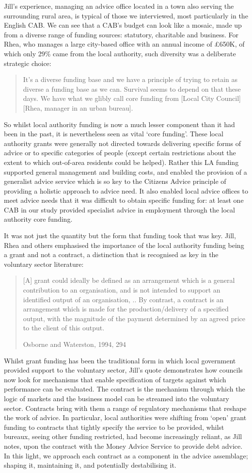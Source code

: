 Jill’s experience, managing an advice office located in a town also serving the surrounding rural area, is typical of those we interviewed, most particularly in the English CAB. We can see that a CAB’s budget can look like a mosaic, made up from a diverse range of funding sources: statutory, charitable and business. For Rhea, who manages a large city-based office with an annual income of £650K, of which only 29\% came from the local authority, such diversity was a deliberate strategic choice:
    \blockquote{It’s a diverse funding base and we have a principle of trying to retain as diverse a funding base as we can. Survival seems to depend on that these days. We have what we glibly call core funding from [Local City Council] [Rhea, manager in an urban bureau].}
So whilst local authority funding is now a much lesser component than it had been in the past, it is nevertheless seen as vital ‘core funding’. These local authority grants were generally not directed towards delivering specific forms of advice or to specific categories of people (except certain restrictions about the extent to which out-of-area residents could be helped). Rather this LA funding supported general management and building costs, and enabled the provision of a generalist advice service which is so key to the Citizens Advice principle of providing a holistic approach to advice need. It also enabled local advice offices to meet advice needs that it was difficult to obtain specific funding for: at least one CAB in our study provided specialist advice in employment through the local authority core funding. 
\par
It was not just the quantity but the form that funding took that was key. Jill, Rhea and others emphasised the importance of the local authority funding being a grant and not a contract, a distinction that is recognised as key in the voluntary sector literature:
\par
    \blockquote[Osborne and Waterston, 1994, 294]{[A] grant could ideally be defined as an arrangement which is a general contribution to an organisation, and is not intended to support an identified output of an organisation, .. By contrast, a contract is an arrangement which is made for the production/delivery of a specified output, with the magnitude of the payment determined by an agreed price to the client of this output.}
Whilst grant funding has been the traditional form in which local government provided support to the voluntary sector, Jill’s quote demonstrates how councils now look for mechanisms that enable specification of targets against which performance can be evaluated. The contract is the mechanism through which the logic of markets and the business model can be streamed into the voluntary sector. Contracts bring with them a range of regulatory mechanisms that reshape the work of advice. In particular, local authorities were shifting from ‘open’ grant funding to contracts that tightly specify the service to be provided, whilst bureaux, seeing other funding restricted, had become increasingly reliant, as Jill notes, upon the contract with the Money Advice Service to provide debt advice. In this light, we approach each contract as a component in the advice assemblage; shaping it, maintaining it, and potentially destabilising it. 

